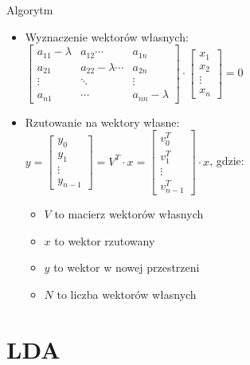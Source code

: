 \documentclass[a4paper]{beamer}
\begin{document}
\begin{frame}
\begin{block}{Algorytm}
\begin{itemize}
\item Wyznaczenie wektorów własnych: $\begin{bmatrix} a_{11}-\lambda & a_{12} \cdots & a_{1n} \\ a_{21} & a_{22}-\lambda \cdots & a_{2n}\\ \vdots & \ddots & \vdots \\ a_{n1} & \cdots & a_{nn}-\lambda\end{bmatrix} \cdot \begin{bmatrix} x_1 \\ x_2 \\ \vdots \\ x_n \end{bmatrix}=0$
\item Rzutowanie na wektory własne: \\ $y=\begin{bmatrix} y_0 \\ y_1 \\ \vdots \\ y_{n-1} \end{bmatrix}=V^T \cdot x =\begin{bmatrix} v_0^T \\ v_1^T \\ \vdots \\ v_{n-1}^T \end{bmatrix} \cdot x $, gdzie: \\
\begin{itemize}
\item $V$ to macierz wektorów własnych
\item $x$ to wektor rzutowany
\item $y$ to wektor w nowej przestrzeni
\item $N$ to liczba wektorów własnych 
\end{itemize}

\end{itemize}
\end{block}
\end{frame}

\section{LDA}
\begin{frame}

\end{frame}
\end{document}
